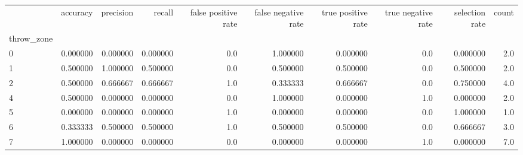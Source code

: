 \begin{tabular}{lrrrrrrrrr}
\toprule
{} &  accuracy &  precision &    recall &  false positive rate &  false negative rate &  true positive rate &  true negative rate &  selection rate &  count \\
throw\_zone &           &            &           &                      &                      &                     &                     &                 &        \\
\midrule
0          &  0.000000 &   0.000000 &  0.000000 &                  0.0 &             1.000000 &            0.000000 &                 0.0 &        0.000000 &    2.0 \\
1          &  0.500000 &   1.000000 &  0.500000 &                  0.0 &             0.500000 &            0.500000 &                 0.0 &        0.500000 &    2.0 \\
2          &  0.500000 &   0.666667 &  0.666667 &                  1.0 &             0.333333 &            0.666667 &                 0.0 &        0.750000 &    4.0 \\
4          &  0.500000 &   0.000000 &  0.000000 &                  0.0 &             1.000000 &            0.000000 &                 1.0 &        0.000000 &    2.0 \\
5          &  0.000000 &   0.000000 &  0.000000 &                  1.0 &             0.000000 &            0.000000 &                 0.0 &        1.000000 &    1.0 \\
6          &  0.333333 &   0.500000 &  0.500000 &                  1.0 &             0.500000 &            0.500000 &                 0.0 &        0.666667 &    3.0 \\
7          &  1.000000 &   0.000000 &  0.000000 &                  0.0 &             0.000000 &            0.000000 &                 1.0 &        0.000000 &    7.0 \\
\bottomrule
\end{tabular}
